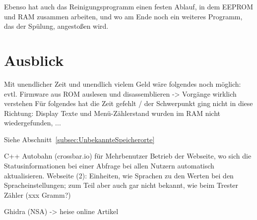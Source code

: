 Ebenso hat auch das Reinigungsprogramm einen festen Ablauf, in dem \ac{EEPROM} und \ac{RAM} zusammen arbeiten, und wo am Ende noch ein weiteres Programm, das der Spülung, angestoßen wird.

\section{Ausblick}\todo
Mit unendlicher Zeit und unendlich vielem Geld wäre folgendes noch möglich: evtl. \todo
Firmware aus ROM auslesen und disassemblieren -> Vorgänge wirklich verstehen
Für folgendes hat die Zeit gefehlt / der Schwerpunkt ging nicht in diese Richtung: Display Texte und Menü-Zählerstand wurden im RAM nicht wiedergefunden, ...

Siehe Abschnitt~\ref{subsec:UnbekannteSpeicherorte}

C++ Autobahn (crossbar.io) für Mehrbenutzer Betrieb der Webseite, wo sich die Statusinformationen bei einer Abfrage bei allen Nutzern automatisch aktualisieren.
Webseite (2): Einheiten, wie Sprachen zu den Werten bei den Spracheinstellungen; zum Teil aber auch gar nicht bekannt, wie beim Trester Zähler (xxx Gramm?)

Ghidra (NSA) -> heise online Artikel
